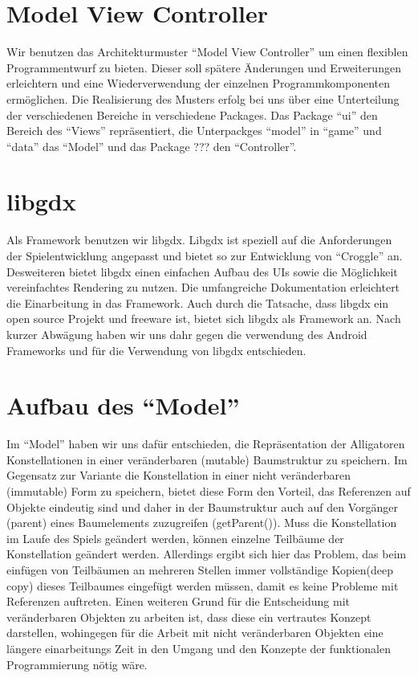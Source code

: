 \section{Model View Controller}
Wir benutzen das Architekturmuster "`Model View Controller"' um einen flexiblen Programmentwurf zu bieten.
Dieser soll spätere Änderungen und Erweiterungen erleichtern und eine Wiederverwendung der einzelnen 
Programmkomponenten ermöglichen.
Die Realisierung des Musters erfolg bei uns über eine Unterteilung der verschiedenen Bereiche in verschiedene Packages. Das Package "`ui"' den Bereich des "`Views"' repräsentiert, die Unterpackges
 "`model"' in "`game"' und "`data"' das "`Model"' und das Package ??? den "`Controller"'.

\section{libgdx}
Als Framework benutzen wir libgdx. Libgdx ist speziell auf die Anforderungen der Spielentwicklung angepasst
und bietet so zur Entwicklung von "`Croggle"' an. Desweiteren bietet libgdx einen einfachen Aufbau des UIs sowie die Möglichkeit vereinfachtes Rendering zu nutzen. Die umfangreiche Dokumentation erleichtert die
Einarbeitung in das Framework. Auch durch die Tatsache, dass libgdx ein open source Projekt und freeware ist, bietet sich libgdx als Framework an. Nach kurzer Abwägung haben wir uns dahr gegen die verwendung des Android Frameworks und für die Verwendung von libgdx entschieden.

\section{Aufbau des "`Model"'}
Im "`Model"' haben wir uns dafür entschieden, die Repräsentation der Alligatoren Konstellationen in einer 
veränderbaren (mutable) Baumstruktur zu speichern. Im Gegensatz zur Variante die Konstellation in einer nicht veränderbaren (immutable) Form zu speichern, bietet diese Form den Vorteil, das Referenzen auf Objekte eindeutig sind und daher in der Baumstruktur auch auf den Vorgänger (parent) eines Baumelements zuzugreifen (getParent()). Muss die Konstellation im Laufe des Spiels geändert werden, können einzelne Teilbäume der Konstellation geändert werden. Allerdings ergibt sich hier das Problem, das beim einfügen von Teilbäumen an mehreren Stellen immer vollständige Kopien(deep copy) dieses Teilbaumes eingefügt werden müssen, damit es keine Probleme mit Referenzen auftreten.
Einen weiteren Grund für die Entscheidung mit veränderbaren Objekten zu arbeiten ist, dass diese ein vertrautes Konzept darstellen, wohingegen für die Arbeit mit nicht veränderbaren Objekten eine längere einarbeitungs Zeit in den Umgang und den Konzepte der funktionalen Programmierung nötig wäre. 

